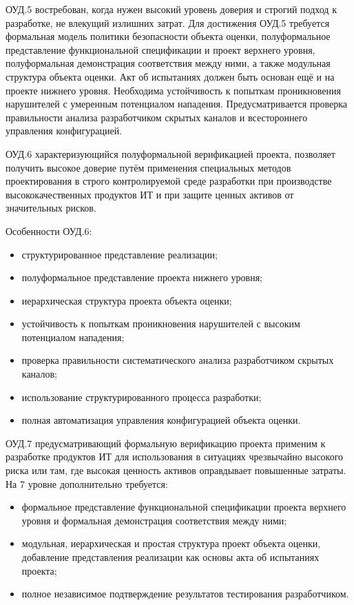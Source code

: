 \documentclass[12pt, russian, oneside, article]{ncc}
\begin{document}
ОУД.5 востребован, когда нужен высокий уровень доверия и строгий подход к разработке, не влекущий излишних затрат. Для достижения ОУД.5 требуется формальная модель политики безопасности объекта оценки, полуформальное представление функциональной спецификации и проект верхнего уровня, полуформальная демонстрация соответствия между ними, а также модульная структура объекта оценки. Акт об испытаниях должен быть основан ещё и на проекте нижнего уровня. Необходима устойчивость к попыткам проникновения нарушителей с умеренным потенциалом нападения. Предусматривается проверка правильности анализа разработчиком скрытых каналов и всестороннего управления конфигурацией.

ОУД.6 характеризующийся полуформальной верификацией проекта, позволяет получить высокое доверие путём применения специальных методов проектирования в строго контролируемой среде разработки при производстве высококачественных продуктов ИТ и при защите ценных активов от значительных рисков.

Особенности ОУД.6:
\begin{itemize}
\item структурированное представление реализации;
\item полуформальное представление проекта нижнего уровня;
\item иерархическая структура проекта объекта оценки;
\item устойчивость к попыткам проникновения нарушителей с высоким потенциалом нападения;
\item проверка правильности систематического анализа разработчиком скрытых каналов;
\item использование структурированного процесса разработки;
\item полная автоматизация управления конфигурацией объекта оценки.
\end{itemize}

ОУД.7 предусматривающий формальную верификацию проекта применим к разработке продуктов ИТ для использования в ситуациях чрезвычайно высокого риска или там, где высокая ценность активов оправдывает повышенные затраты. На 7 уровне дополнительно требуется:
\begin{itemize}
\item формальное представление функциональной спецификации проекта верхнего уровня и формальная демонстрация соответствия между ними;
\item модульная, иерархическая и простая структура проект объекта оценки, добавление представления реализации как основы акта об испытаниях проекта;
\item полное независимое подтверждение результатов тестирования разработчиком.
\end{itemize}
\end{document}

